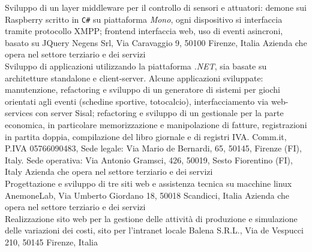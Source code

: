\documentclass[totpages,openbib,italian]{europecv}
\begin{document}
\begin{europecv}

{Sviluppo di un layer middleware per il controllo di sensori e 
    attuatori: demone sui Raspberry scritto in \texttt{C\#} su
    piattaforma \emph{Mono}, ogni dispositivo si interfaccia
    tramite protocollo XMPP; frontend interfaccia web, uso di 
    eventi asincroni, basato su JQuery}
{Negens Srl, Via Caravaggio 9, 50100 Firenze, Italia}
{Azienda che opera nel settore terziario e dei servizi}
\\
{Sviluppo di applicazioni utilizzando la piattaforma \emph{.NET}, 
  sia basate su architetture standalone e client-server. Alcune applicazioni
  sviluppate: manutenzione, refactoring e sviluppo di un generatore di sistemi
  per giochi orientati agli eventi (schedine sportive, totocalcio), interfacciamento
  via web-services con server Sisal; refactoring e sviluppo di un gestionale 
  per la parte economica, in particolare memorizzazione e manipolazione
  di fatture, registrazioni in partita doppia, compilazione del libro giornale
  e di registri IVA.}
{Comm.it, P.IVA 05766090483, Sede legale: Via Mario de Bernardi, 65,
  50145, Firenze (FI), Italy. Sede operativa: Via Antonio Gramsci,
  426,
  50019, Sesto Fiorentino (FI), Italy }
{Azienda che opera nel settore terziario e dei servizi}
\\
{Progettazione e sviluppo di tre siti web e assistenza tecnica su
  macchine linux}
{AnemoneLab, Via Umberto Giordano 18, 50018 Scandicci, Italia}
{Azienda che opera nel settore terziario e dei servizi}
\\
{Realizzazione sito web per la gestione delle attivit\`a di produzione
  e simulazione delle variazioni dei costi, sito per l'intranet locale}
{Balena S.R.L., Via de Vespucci 210, 50145 Firenze, Italia}

\end{europecv}
\end{document}
